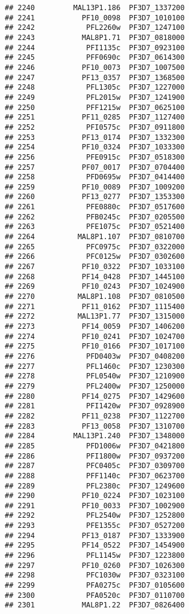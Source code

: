 \documentclass{article}\usepackage[]{graphicx}\usepackage[]{color}
\makeatletter
\newenvironment{kframe}{%
 \def\at@end@of@kframe{}%
 \ifinner\ifhmode%
  \def\at@end@of@kframe{\end{minipage}}%
  \begin{minipage}{\columnwidth}%
 \fi\fi%
 \def\FrameCommand##1{\hskip\@totalleftmargin \hskip-\fboxsep
 \colorbox{shadecolor}{##1}\hskip-\fboxsep
     \hskip-\linewidth \hskip-\@totalleftmargin \hskip\columnwidth}%
 \MakeFramed {\advance\hsize-\width
   \@totalleftmargin\z@ \linewidth\hsize
   \@setminipage}}%
 {\par\unskip\endMakeFramed%
 \at@end@of@kframe}
\newenvironment{knitrout}{}{} %
\makeatother
\begin{document}
\begin{knitrout}
\begin{kframe}
\begin{verbatim}
## 2240         MAL13P1.186  PF3D7_1337200
## 2241           PF10_0098  PF3D7_1010100
## 2242            PFL2260w  PF3D7_1247100
## 2243           MAL8P1.71  PF3D7_0818000
## 2244            PFI1135c  PF3D7_0923100
## 2245            PFF0690c  PF3D7_0614300
## 2246           PF10_0073  PF3D7_1007500
## 2247           PF13_0357  PF3D7_1368500
## 2248            PFL1305c  PF3D7_1227000
## 2249            PFL2015w  PF3D7_1241900
## 2250            PFF1215w  PF3D7_0625100
## 2251           PF11_0285  PF3D7_1127400
## 2252            PFI0575c  PF3D7_0911800
## 2253           PF13_0174  PF3D7_1332300
## 2254           PF10_0324  PF3D7_1033300
## 2256            PFE0915c  PF3D7_0518300
## 2257           PF07_0017  PF3D7_0704400
## 2258            PFD0695w  PF3D7_0414400
## 2259           PF10_0089  PF3D7_1009200
## 2260           PF13_0277  PF3D7_1353300
## 2261            PFE0880c  PF3D7_0517600
## 2262            PFB0245c  PF3D7_0205500
## 2263            PFE1075c  PF3D7_0521400
## 2264          MAL8P1.107  PF3D7_0810700
## 2265            PFC0975c  PF3D7_0322000
## 2266            PFC0125w  PF3D7_0302600
## 2267           PF10_0322  PF3D7_1033100
## 2268           PF14_0428  PF3D7_1445100
## 2269           PF10_0243  PF3D7_1024900
## 2270          MAL8P1.108  PF3D7_0810500
## 2271           PF11_0162  PF3D7_1115400
## 2272          MAL13P1.77  PF3D7_1315000
## 2273           PF14_0059  PF3D7_1406200
## 2274           PF10_0241  PF3D7_1024700
## 2275           PF10_0166  PF3D7_1017100
## 2276            PFD0403w  PF3D7_0408200
## 2277            PFL1460c  PF3D7_1230300
## 2278            PFL0540w  PF3D7_1210900
## 2279            PFL2400w  PF3D7_1250000
## 2280           PF14_0275  PF3D7_1429600
## 2281            PFI1420w  PF3D7_0928900
## 2282           PF11_0238  PF3D7_1122700
## 2283           PF13_0058  PF3D7_1310700
## 2284         MAL13P1.240  PF3D7_1348000
## 2285            PFD1006w  PF3D7_0421800
## 2286            PFI1800w  PF3D7_0937200
## 2287            PFC0405c  PF3D7_0309700
## 2288            PFF1140c  PF3D7_0623700
## 2289            PFL2380c  PF3D7_1249600
## 2290           PF10_0224  PF3D7_1023100
## 2291           PF10_0033  PF3D7_1002900
## 2292            PFL2540w  PF3D7_1252800
## 2293            PFE1355c  PF3D7_0527200
## 2294           PF13_0187  PF3D7_1333900
## 2295           PF14_0522  PF3D7_1454900
## 2296            PFL1145w  PF3D7_1223800
## 2297           PF10_0260  PF3D7_1026300
## 2298            PFC1030w  PF3D7_0323100
## 2299            PFA0275c  PF3D7_0105600
## 2300            PFA0520c  PF3D7_0110700
## 2301           MAL8P1.22  PF3D7_0826400

\end{verbatim}
\end{kframe}
\end{knitrout}
\end{document}

